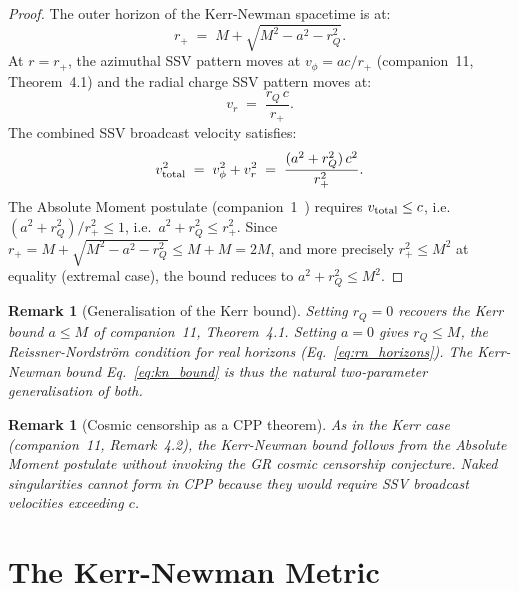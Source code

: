 \documentclass[12pt]{article}
\newtheorem{remark}[theorem]{Remark}
\newcommand{\rQ}{r_Q}
\newcommand{\rplus}{r_+}
\begin{document}
\begin{proof}
The outer horizon of the Kerr-Newman spacetime is at:
\begin{equation}
  \rplus \;=\; M + \sqrt{M^2 - a^2 - \rQ^2}.
  \label{eq:kn_rplus}
\end{equation}
At $r = \rplus$, the azimuthal SSV pattern moves at $v_\phi = ac/\rplus$
(companion~11, Theorem~4.1) and the radial charge SSV pattern moves at:
\begin{equation}
  v_r \;=\; \frac{\rQ\,c}{\rplus}.
  \label{eq:v_charge}
\end{equation}
The combined SSV broadcast velocity satisfies:
\begin{equation}
  v_{\rm total}^2 \;=\; v_\phi^2 + v_r^2
  \;=\; \frac{(a^2 + \rQ^2)\,c^2}{\rplus^2}.
  \label{eq:v_total}
\end{equation}
The Absolute Moment postulate (companion~1~\cite{c1}) requires
$v_{\rm total} \leq c$, i.e.\
$(a^2 + \rQ^2)/\rplus^2 \leq 1$, i.e.\
$a^2 + \rQ^2 \leq \rplus^2$.  Since $\rplus = M + \sqrt{M^2-a^2-\rQ^2}
\leq M + M = 2M$, and more precisely $\rplus^2 \leq M^2$ at equality
(extremal case), the bound reduces to $a^2 + \rQ^2 \leq M^2$.
\end{proof}

\begin{remark}[Generalisation of the Kerr bound]
Setting $\rQ = 0$ recovers the Kerr bound $a \leq M$ of companion~11,
Theorem~4.1.  Setting $a = 0$ gives $\rQ \leq M$, the Reissner-Nordström
condition for real horizons (Eq.~\eqref{eq:rn_horizons}).  The
Kerr-Newman bound Eq.~\eqref{eq:kn_bound} is thus the natural
two-parameter generalisation of both.
\end{remark}

\begin{remark}[Cosmic censorship as a CPP theorem]
As in the Kerr case (companion~11, Remark~4.2), the Kerr-Newman bound
follows from the Absolute Moment postulate without invoking the GR
cosmic censorship conjecture.  Naked singularities cannot form in CPP
because they would require SSV broadcast velocities exceeding $c$.
\end{remark}

\section{The Kerr-Newman Metric}
\label{sec:kn}
\end{document}
